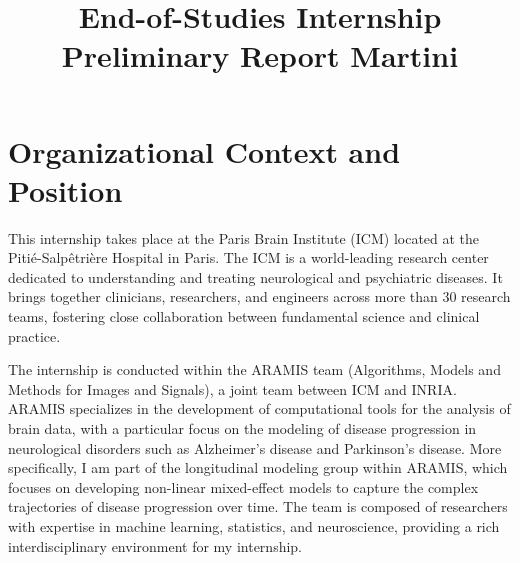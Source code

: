 \documentclass{rapportCS}
\title{End-of-Studies Internship Preliminary Report Martini}
\begin{document}
  
 



 

 
 

 
        
\fairemarges %
\fairepagedegarde %
\setcounter{figure}{0}

\section{Organizational Context and Position}

This internship takes place at the Paris Brain Institute (ICM) located at the Pitié-Salpêtrière Hospital in Paris. The ICM is a world-leading research center dedicated to understanding and treating neurological and psychiatric diseases. It brings together clinicians, researchers, and engineers across more than 30 research teams, fostering close collaboration between fundamental science and clinical practice.
 
The internship is conducted within the ARAMIS team (Algorithms, Models and Methods for Images and Signals), a joint team between ICM and INRIA. ARAMIS specializes in the development of computational tools for the analysis of brain data, with a particular focus on the modeling of disease progression in neurological disorders such as Alzheimer's disease and Parkinson's disease. More specifically, I am part of the longitudinal modeling group within ARAMIS, which focuses on developing non-linear mixed-effect models to capture the complex trajectories of disease progression over time. The team is composed of researchers with expertise in machine learning, statistics, and neuroscience, providing a rich interdisciplinary environment for my internship. \\
\end{document}
